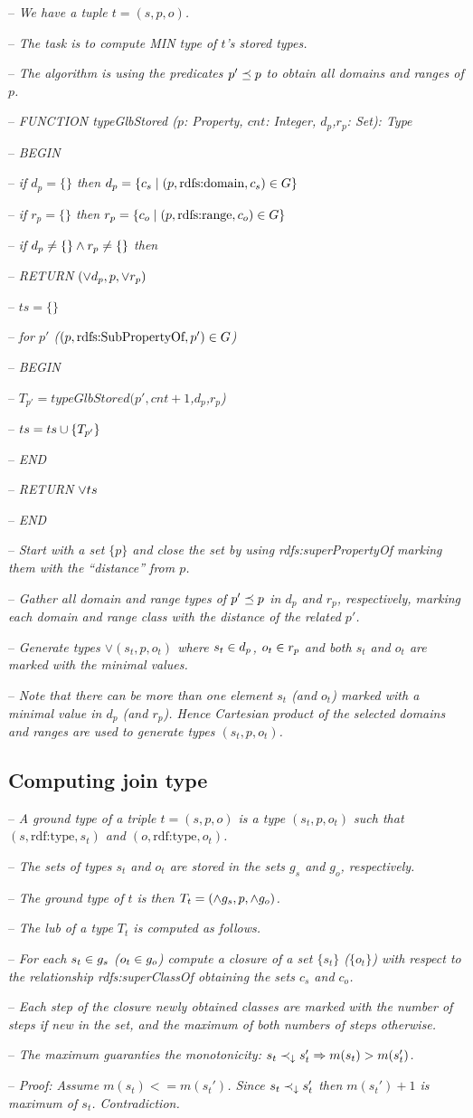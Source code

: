 \documentclass[runningheads]{llncs}
\newcommand{\darr}{\downarrow}
\newcommand{\notes}[1]{\noindent\begin{small}-- \emph{#1}\hfill\break\end{small}}
\newcommand{\nnotes}[1]{\indent\begin{small}-- \emph{#1}\hfill\break\end{small}}
\begin{document}
\notes{We have a tuple $t=(s,p,o)$.}
\nnotes{The task is to compute MIN type of $t$'s stored types.}
\nnotes{The algorithm is using the predicates $p'\preceq\/p$ to obtain all domains and ranges of $p$.}



\notes{FUNCTION typeGlbStored ($p$: Property, $cnt$: Integer, $d_p$,$r_p$: Set): Type}
\notes{BEGIN}
\notes{if $d_p=\{\}$ then $d_p =  \{ c_s \mid (p,\text{rdfs:domain},c_s)\in\/G\}$}
\notes{if $r_p=\{\}$ then $r_p =  \{ c_o \mid (p,\text{rdfs:range},c_o)\in\/G\}$}
\notes{if $d_p\not=\{\}\land\/r_p\not=\{\}$ then }
\notes{RETURN $(\lor\/d_p,p,\lor\/r_p)$}
\notes{$ts = \{\}$}
\notes{for $p'$ ($(p,\text{rdfs:SubPropertyOf},p')\in\/G$)}
\notes{BEGIN}
\notes{$T_{p'} = typeGlbStored(p',cnt+1$,$d_p$,$r_p$)}
\notes{$ts = ts\cup\/\{T_{p'}\}$}
\notes{END}
\notes{RETURN $\lor\/ts$}
\notes{END}




\notes{Start with a set $\{p\}$ and close the set by using rdfs:superPropertyOf marking them with the ``distance'' from $p$.}
\nnotes{Gather all domain and range types of $p'\preceq\/p$ in $d_p$ and $r_p$, respectively, marking each domain and range class with the distance of the related $p'$.}
\nnotes{Generate types $\lor(s_t,p,o_t)$ where $s_t\in\/d_p$, $o_t\in\/r_p$ and both $s_t$ and $o_t$ are marked with the minimal values.}
\nnotes{Note that there can be more than one element $s_t$ (and $o_t$) marked with a minimal value in $d_p$ (and $r_p$). Hence Cartesian product of the selected domains and ranges are used to generate types $(s_t,p,o_t)$. }






\subsection{Computing join type\label{sec:alg-join}}

\notes{A ground type of a triple $t=(s,p,o)$ is a type $(s_t,p,o_t)$ such that $(s,\text{rdf:type},s_t)$ and $(o,\text{rdf:type},o_t)$.}
\notes{The sets of types $s_t$ and $o_t$ are stored in the sets $g_s$ and $g_o$, respectively.}
\notes{The ground type of $t$ is then $T_t=(\land\/g_s,p,\land\/g_o)$.}
\notes{The lub of a type $T_t$ is computed as follows.}

\notes{For each $s_t\in\/g_s$ ($o_t\in\/g_o$) compute a closure of a set $\{s_t\}$ ($\{o_t\}$) with respect to the relationship rdfs:superClassOf obtaining the sets $c_s$ and $c_o$.}
\notes{Each step of the closure newly obtained classes are marked with the number of steps if new in the set, and the maximum of both numbers of steps otherwise.}
\notes{The maximum guaranties the monotonicity: $s_t\prec_\darr\/s_t'\Rightarrow\/m(s_t)>m(s_t')$.}
\notes{Proof: Assume $m(s_t)<=m(s_t')$. Since $s_t\prec_\darr\/s_t'$ then $m(s_t')+1$ is maximum of $s_t$. Contradiction.}
\end{document}
